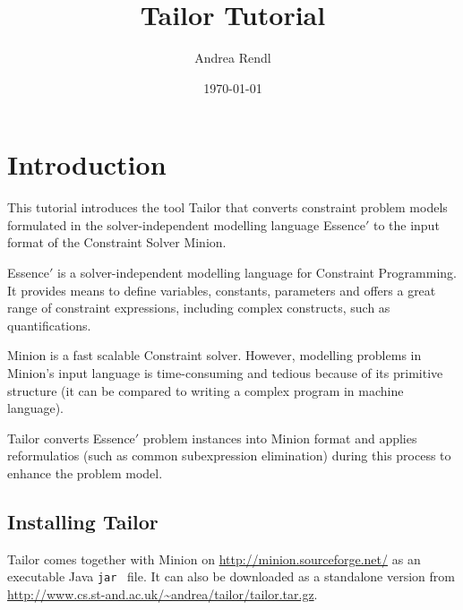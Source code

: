\documentclass{article}
\begin{document}
\title{{\sc Tailor} Tutorial}

\author{Andrea Rendl}


\date{\today}

\maketitle

\section{Introduction}
This tutorial introduces the tool {\sc Tailor} that 
converts constraint problem models formulated in the solver-independent modelling language 
{\sc Essence}$'$ to the input format of the Constraint Solver
{\sc Minion}. 

{\sc Essence}$'$ is a solver-independent modelling 
language for Constraint Programming. It provides means to define 
variables, constants, parameters and offers a great range of 
constraint expressions, including complex constructs, 
such as quantifications.

{\sc Minion} is a fast scalable Constraint solver. 
However, modelling problems in {\sc Minion}'s input
language is time-consuming and tedious because of its 
primitive structure (it can be compared to writing a 
complex program in machine language).

{\sc Tailor} converts {\sc Essence}$'$ problem instances
into {\sc Minion} format and applies reformulatios  
(such as common subexpression elimination) during this 
process to enhance the problem model.

\subsection{Installing {\sc Tailor}}
{\sc Tailor} comes together with {\sc Minion} on
\url{http://minion.sourceforge.net/} as an executable 
Java {\tt jar}~\cite{java} file. It can also be downloaded
as a standalone version from 
\url{http://www.cs.st-and.ac.uk/~andrea/tailor/tailor.tar.gz}.
\end{document}

